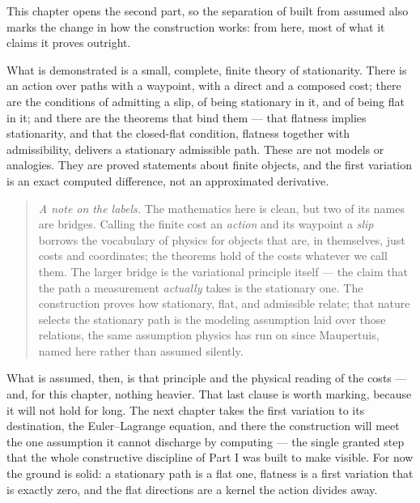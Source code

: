 This chapter opens the second part, so the separation of built from assumed also marks the change in
how the construction works: from here, most of what it claims it proves outright.

What is demonstrated is a small, complete, finite theory of stationarity. There is an action over
paths with a waypoint, with a direct and a composed cost; there are the conditions of admitting a
slip, of being stationary in it, and of being flat in it; and there are the theorems that bind them ---
that flatness implies stationarity, and that the closed-flat condition, flatness together with
admissibility, delivers a stationary admissible path. These are not models or analogies. They are
proved statements about finite objects, and the first variation is an exact computed difference, not
an approximated derivative.

\begin{quote}
\emph{A note on the labels.} The mathematics here is clean, but two of its names are bridges. Calling
the finite cost an \emph{action} and its waypoint a \emph{slip} borrows the vocabulary of physics for
objects that are, in themselves, just costs and coordinates; the theorems hold of the costs whatever we
call them. The larger bridge is the variational principle itself --- the claim that the path a
measurement \emph{actually} takes is the stationary one. The construction proves how stationary, flat,
and admissible relate; that nature selects the stationary path is the modeling assumption laid over
those relations, the same assumption physics has run on since Maupertuis, named here rather than
assumed silently.
\end{quote}

What is assumed, then, is that principle and the physical reading of the costs --- and, for this
chapter, nothing heavier. That last clause is worth marking, because it will not hold for long. The
next chapter takes the first variation to its destination, the Euler--Lagrange equation, and there the
construction will meet the one assumption it cannot discharge by computing --- the single granted step
that the whole constructive discipline of Part I was built to make visible. For now the ground is
solid: a stationary path is a flat one, flatness is a first variation that is exactly zero, and the
flat directions are a kernel the action divides away.
